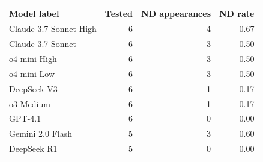 \begin{tabular}{lrrr}
\toprule
Model label & Tested & ND appearances & ND rate \\
\midrule
Claude-3.7 Sonnet High & 6 & 4 & 0.67 \\
Claude-3.7 Sonnet & 6 & 3 & 0.50 \\
o4-mini High & 6 & 3 & 0.50 \\
o4-mini Low & 6 & 3 & 0.50 \\
DeepSeek V3 & 6 & 1 & 0.17 \\
o3 Medium & 6 & 1 & 0.17 \\
GPT-4.1 & 6 & 0 & 0.00 \\
Gemini 2.0 Flash & 5 & 3 & 0.60 \\
DeepSeek R1 & 5 & 0 & 0.00 \\
\bottomrule
\end{tabular}
